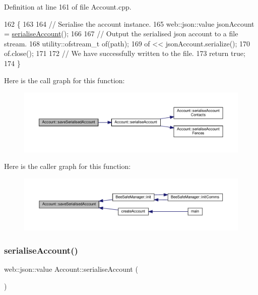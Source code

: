 Definition at line 161 of file Account.\+cpp.


\begin{DoxyCode}
162 \{
163 
164     \textcolor{comment}{// Serialise the account instance.}
165     web::json::value jsonAccount = \hyperlink{class_account_a1e9b184e8a6ddf67e8814e6c575f657e}{serialiseAccount}();
166 
167     \textcolor{comment}{// Output the serialised json account to a file stream.}
168     utility::ofstream\_t of(path);
169     of << jsonAccount.serialize();
170     of.close();
171 
172     \textcolor{comment}{// We have successfully written to the file.}
173     \textcolor{keywordflow}{return} \textcolor{keyword}{true};
174 \}
\end{DoxyCode}
Here is the call graph for this function\+:
\nopagebreak
\begin{figure}[H]
\begin{center}
\leavevmode
\includegraphics[width=350pt]{db/d22/class_account_a9ff3a257536bc933e0a39207bb89243d_cgraph}
\end{center}
\end{figure}
Here is the caller graph for this function\+:
\nopagebreak
\begin{figure}[H]
\begin{center}
\leavevmode
\includegraphics[width=350pt]{db/d22/class_account_a9ff3a257536bc933e0a39207bb89243d_icgraph}
\end{center}
\end{figure}
\mbox{\label{class_account_a1e9b184e8a6ddf67e8814e6c575f657e}} 
\subsubsection{\texorpdfstring{serialise\+Account()}{serialiseAccount()}}
{\footnotesize\ttfamily web\+::json\+::value Account\+::serialise\+Account (\begin{DoxyParamCaption}{ }\end{DoxyParamCaption})}

